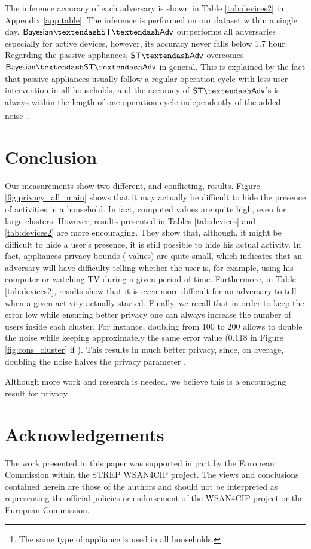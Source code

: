\documentclass[11pt,a4paper]{article}
\theoremstyle{plain}
\theoremstyle{plain}
\theoremstyle{plain}
\theoremstyle{plain}
\theoremstyle{nonumberplain} \theoremseparator{}
\newcommand{\statadv}{\ensuremath{\mathsf{ST\textendash Adv}}\xspace}
\newcommand{\bstatadv}{\ensuremath{\mathsf{Bayesian\textendash ST\textendash Adv}}\xspace}
\begin{document}
The inference accuracy of each adversary is shown in Table \ref{tab:devices2} in Appendix \ref{app:table}. The inference is performed on our dataset within a single day.
\bstatadv outperforms all adversaries especially for active devices, however, its accuracy never falls below  1.7 hour. Regarding the passive appliances, \statadv overcomes \bstatadv in general. This is explained by the fact that passive appliances usually follow a regular operation cycle with less user intervention in all households, and the accuracy of \statadv 's is always within the length of one operation cycle independently of the added noise\footnote{The same type of appliance is used in all households.}. 





\section{Conclusion}
Our measurements show two different, and conflicting, results. Figure \ref{fig:privacy_all_main} shows that it may actually be 
difficult to hide the presence of activities in a household. 
In fact,  computed  values are quite high, even for large clusters. However, results presented
in Tables \ref{tab:devices} and \ref{tab:devices2}  are more encouraging. They show that, although, it might be difficult to hide a user's presence,
it is still possible to hide his actual activity. In fact, appliances privacy bounds ( values) are quite small, which indicates
that an adversary will have difficulty telling whether the user is, for example, using his computer or watching TV during a given period
of time. Furthermore, in Table \ref{tab:devices2}, results show that it is even more difficult for an adversary to tell when a given activity actually started. 
Finally, we recall that in order to keep the error  low while ensuring better privacy one can always 
increase the number of users inside each cluster. For instance, doubling  from 100 to 200 allows to double the
noise while keeping approximately the same error value (0.118 in Figure \ref{fig:cons_cluster} if ). 
This results in much better privacy, since, on average, doubling the noise halves the privacy parameter .    

Although more work and research is needed, we believe this is a encouraging  result for privacy. 



\section*{Acknowledgements}
The work presented in this paper was supported in part by the European 
Commission within the STREP WSAN4CIP project. The views and conclusions 
contained herein are those of the authors and should not be interpreted 
as representing the official policies or endorsement of the WSAN4CIP project 
or the European Commission.
\end{document}
